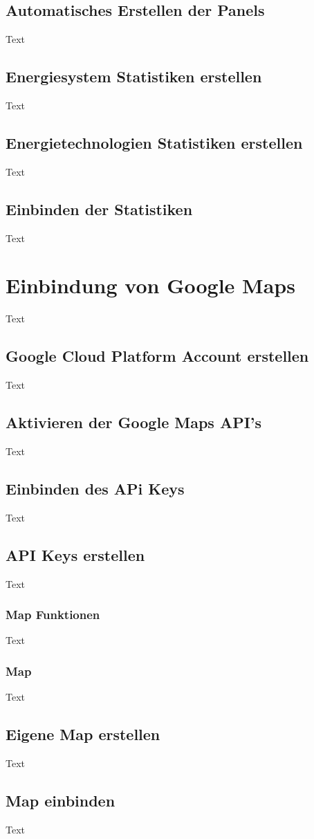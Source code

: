 \subsection{Automatisches Erstellen der Panels}
Text
\subsection{Energiesystem Statistiken erstellen}
Text
\subsection{Energietechnologien Statistiken erstellen}
Text
\subsection{Einbinden der Statistiken}
Text

\section{Einbindung von Google Maps}
Text
\subsection{Google Cloud Platform Account erstellen}
Text
\subsection{Aktivieren der Google Maps API’s}
Text
\subsection{Einbinden des APi Keys}
Text
\subsection{API Keys erstellen}
Text
\subsubsection{Map Funktionen}
Text
\subsubsection{Map}
Text
\subsection{Eigene Map erstellen}
Text
\subsection{Map einbinden}
Text





